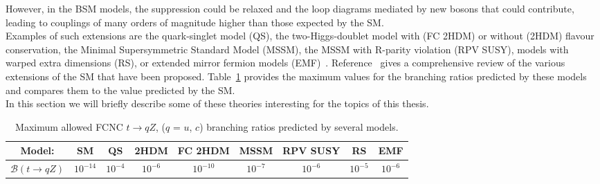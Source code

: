 \noindent However, in the BSM models, the suppression could be relaxed and the loop diagrams mediated by new bosons that could contribute, 
leading to couplings of many orders of magnitude higher than those expected by the SM.\\
Examples of such extensions are the quark-singlet model (QS)\cite{qs_limit}, the two-Higgs-doublet model with (FC 2HDM) or without (2HDM) flavour conservation\cite{h2dm_limit},
the Minimal Supersymmetric Standard Model (MSSM)\cite{mssm_limit}, the MSSM with R-parity violation (RPV SUSY)\cite{RPV_limit}, models with warped extra dimensions (RS)\cite{extra_limit}, or extended mirror fermion models (EMF)~\cite{rs_limit}.
Reference~\cite{report_limit} gives a comprehensive review of the various extensions of the SM that have been proposed.
Table~\ref{tab:expBR} provides the maximum values for the branching ratios  predicted by these models and compares them to the value predicted by the SM.\\
In this section we will briefly describe some of these theories interesting for the topics of this thesis.
\begin{table}[!h]
	\begin{adjustbox}{max width=1.\textwidth,center}
		\begin{tabular}{ccccccccc}
			\hline 
			Model:&  			                         SM&  				   QS&  			   2HDM&  				FC 2HDM				& MSSM 			&  RPV SUSY			&  			RS				& EMF \\ 
			\hline 
			$\mathcal{B}(t\rightarrow qZ)$ & $10^{-14}$     & $10^{-4}$ &  $10^{-6}$          & $10^{-10}$  & $10^{-7}$      &$10^{-6}$            & $10^{-5}$           & $10^{-6}$  \\ 
			\hline 
		\end{tabular} 
	\end{adjustbox}
\caption{Maximum allowed FCNC $t\rightarrow qZ$, ($q$ = $u$, $c$) branching ratios predicted by several models\cite{tcZ_sm,qs_limit,h2dm_limit,mssm_limit,RPV_limit,extra_limit,rs_limit,report_limit}.}
\label{tab:expBR}
\end{table} 


